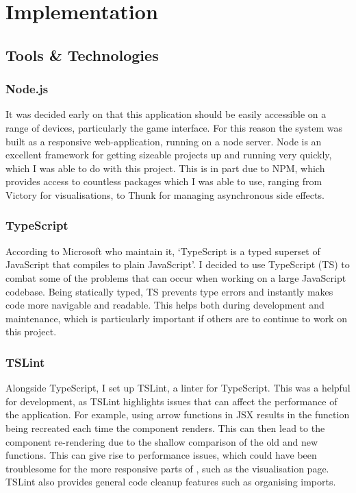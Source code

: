 \chapter{Implementation}

\section{Tools \& Technologies}

\subsection{Node.js}
It was decided early on that this application should be easily accessible on a range of devices, particularly the game interface. 
For this reason the system was built as a responsive web-application, running on a node server. 
Node\cite{Node} is an excellent framework for getting sizeable projects up and running very quickly, which I was able to do with this project. 
This is in part due to NPM\cite{npm}, which provides access to countless packages which I was able to use, ranging from Victory\cite{Victory} for visualisations, to Thunk\cite{Thunk} for managing asynchronous side effects.

\subsection{TypeScript}
According to Microsoft who maintain it, `TypeScript is a typed superset of JavaScript that compiles to plain JavaScript'\cite{Typescript}. 
I decided to use TypeScript (TS) to combat some of the problems that can occur when working on a large JavaScript codebase. 
Being statically typed, TS prevents type errors and instantly makes code more navigable and readable. 
This helps both during development and maintenance, which is particularly important if others are to continue to work on this project.

\subsection{TSLint}
Alongside TypeScript, I set up TSLint\cite{TSLint}, a linter for TypeScript. This was a helpful for development, as TSLint highlights issues that can affect the performance of the application. For example, using arrow functions in JSX results in the function being recreated each time the component renders. This can then lead to the component re-rendering due to the shallow comparison of the old and new functions. This can give rise to performance issues, which could have been troublesome for the more responsive parts of \od{}, such as the visualisation page. TSLint also provides general code cleanup features such as organising imports.

